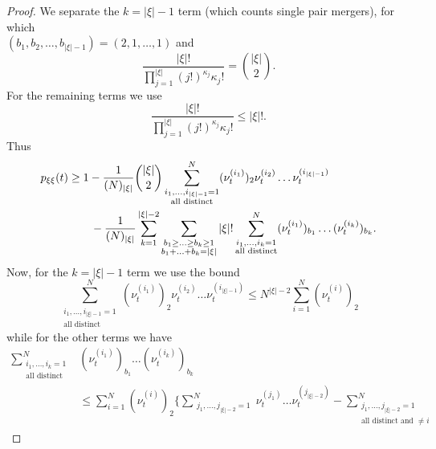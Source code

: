 \begin{proof}
We separate the $k=|\xi|-1$ term (which counts single pair mergers), for which\\ $(b_1, b_2, \dots, b_{|\xi|-1}) = (2,1,\dots,1)$ and
\begin{equation*}
\frac{ | \xi |! }{ \prod_{ j = 1 }^{ | \xi | } ( j ! )^{ \kappa_j } \kappa_j ! }
= \binom{|\xi|}{2} .
\end{equation*}
For the remaining terms we use
\begin{equation*}
\frac{ | \xi |! }{ \prod_{ j = 1 }^{ | \xi | } ( j ! )^{ \kappa_j } \kappa_j ! }
\leq |\xi|! .
\end{equation*}
Thus
\begin{align}
p_{ \xi \xi }( t ) 
&\geq 1 - \frac{ 1 }{ ( N )_{ | \xi | } } \binom{|\xi|}{2}
        \sum_{ \substack{ i_1, \ldots, i_{|\xi|-1} = 1 \\ \text{all distinct} } }^N 
        ( \nu_t^{ ( i_1 ) } )_2 \nu_t^{(i_2)} \ldots \nu_t^{ ( i_{|\xi|-1} ) } \notag\\
    &\qquad- \frac{ 1 }{ ( N )_{ | \xi | } } \sum_{ k = 1 }^{ | \xi | - 2 } 
        \sum_{ \substack{ b_1 \geq \ldots \geq b_k \geq 1 
        \\ b_1 + \ldots + b_k = | \xi | } } |\xi|!
        \sum_{ \substack{ i_1, \ldots, i_k = 1 \\ \text{all distinct} } }^N 
        ( \nu_t^{ ( i_1 ) } )_{ b_1 } \ldots ( \nu_t^{ ( i_k ) } )_{ b_k } . \label{eq:pDeltaLB_1}
\end{align}
Now, for the $k=|\xi|-1$ term we use the bound
\begin{equation*}
\sum_{\substack{ i_1, \ldots, i_{ | \xi | - 1 } = 1 \\ \text{all distinct} }}^N 
        ( \nu_t^{ ( i_1 ) } )_2 \nu_t^{ ( i_2 ) } \ldots \nu_t^{ ( i_{ | \xi | - 1 } ) }
\leq N^{ | \xi | - 2 } \sum_{ i = 1 }^N ( \nu_t^{ ( i ) } )_2
\end{equation*}
while for the other terms we have \parencite[similarly to][Lemma 1 Case 3]{koskela2018}
\begin{align*}
\sum_{ \substack{ i_1, \ldots, i_k = 1 \\ \text{all distinct} } }^N 
        &( \nu_t^{ ( i_1 ) } )_{ b_1 } \ldots ( \nu_t^{ ( i_k ) } )_{ b_k } \\
&\leq \sum_{ i = 1 }^N ( \nu_t^{ ( i ) } )_2 
        \Bigg\{ \sum_{\substack{ j_1, \ldots, j_{ | \xi | - 2 } = 1 }}^N
        \nu_t^{ ( j_1 ) } \ldots \nu_t^{ ( j_{ | \xi | - 2 } ) }
        - \sum_{ \substack{ j_1, \ldots, j_{ | \xi | - 2 } = 1 
        \\ \text{all distinct and } \neq i } }^N 

\end{align*}
\end{proof}
